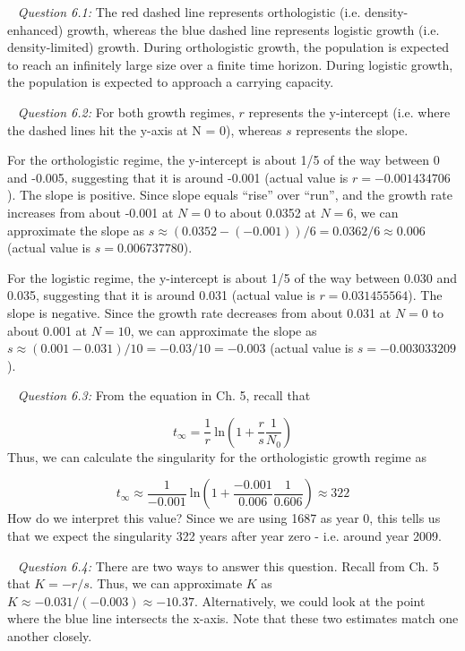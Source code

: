 \documentclass[12pt]{article}
\begin{document}
\pagebreak
{}

~\newline
\textit{Question 6.1:}
\newline
The red dashed line represents orthologistic (i.e. density-enhanced) growth, whereas the blue dashed line represents logistic growth (i.e. density-limited) growth. During orthologistic growth, the population is expected to reach an infinitely large size over a finite time horizon. During logistic growth, the population is expected to approach a carrying capacity.

~\newline
\textit{Question 6.2:}
\newline
For both growth regimes, $r$ represents the y-intercept (i.e. where the dashed lines hit the y-axis at N = 0), whereas $s$ represents the slope.

For the orthologistic regime, the y-intercept is about 1/5 of the way between 0 and -0.005, suggesting that it is around -0.001 (actual value is $r = -0.001434706$). The slope is positive. Since slope equals ``rise'' over ``run'', and the growth rate increases from about -0.001 at $N = 0$ to about 0.0352 at $N = 6$, we can approximate the slope as $s \approx (0.0352 - (-0.001))/6 = 0.0362/6 \approx 0.006$ (actual value is $s = 0.006737780$).

For the logistic regime, the y-intercept is about 1/5 of the way between 0.030 and 0.035, suggesting that it is around 0.031 (actual value is $r = 0.031455564$). The slope is negative. Since the growth rate decreases from about 0.031 at $N = 0$ to about 0.001 at $N = 10$, we can approximate the slope as $s \approx (0.001 - 0.031)/10 = -0.03/10 = -0.003$ (actual value is $s = -0.003033209$).

~\newline
\textit{Question 6.3:}
\newline
From the equation in Ch. 5, recall that

$$t_\infty = \frac{1}{r}~\mathrm{ln}\left(1 + \frac{r}{s}\frac{1}{N_0} \right)$$
Thus, we can calculate the singularity for the orthologistic growth regime as

$$t_\infty \approx \frac{1}{-0.001}~\mathrm{ln}\left(1 + \frac{-0.001}{0.006}\frac{1}{0.606} \right) \approx 322$$
How do we interpret this value? Since we are using 1687 as year 0, this tells us that we expect the singularity 322 years after year zero - i.e. around year 2009.

~\newline
\textit{Question 6.4:}
\newline
There are two ways to answer this question. Recall from Ch. 5 that $K = -r/s$. Thus, we can approximate $K$ as $K \approx -0.031/(-0.003) \approx -10.37$. Alternatively, we could look at the point where the blue line intersects the x-axis. Note that these two estimates match one another closely.
\end{document}
